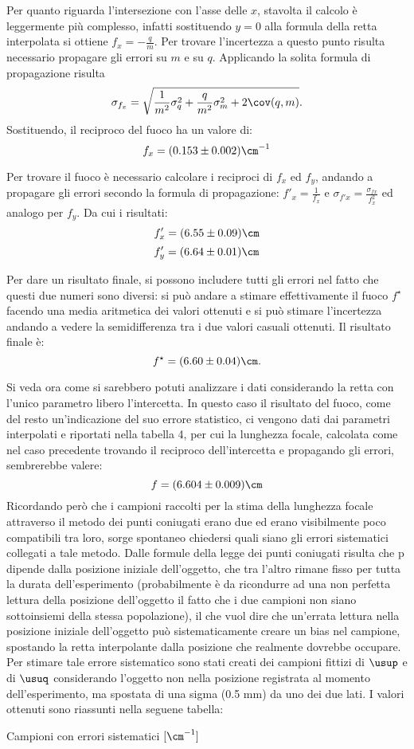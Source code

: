 Per quanto riguarda l'intersezione con l'asse delle $x$, stavolta il calcolo è leggermente più complesso, infatti sostituendo $y = 0$
 alla formula della retta interpolata si ottiene $f_x = -\frac{q}{m}$.  Per trovare l'incertezza a questo punto risulta necessario
 propagare gli errori su $m$ e su $q$. Applicando la solita formula di propagazione risulta
\[\sigma_{f_x} = \sqrt {\frac{1} {m^2} \sigma_q^2 + \frac{q}{m^2} \sigma_m^2 + 2 \cov (q,m) }.\] Sostituendo,
 il reciproco del fuoco ha un valore di:
\[f_x = (0.153 \pm 0.002) \cm^{-1}\]

Per trovare il fuoco è necessario calcolare i reciproci di $f_x$ ed $f_y$, andando a propagare gli errori secondo la formula di 
propagazione: $f'_x = \frac{1}{f_x}$ e $\sigma_{f'x} = \frac{\sigma_{fx}}{f_{x}^2}$ ed analogo per $f_y$. Da cui i risultati:
\[f'_x = (6.55 \pm 0.09) \cm \]
\[f'_y = (6.64 \pm 0.01) \cm \]

Per dare un risultato finale, si possono includere tutti gli errori nel fatto che questi due numeri sono diversi: si può andare a
 stimare effettivamente il fuoco $f^{\star}$ facendo una media aritmetica dei valori ottenuti e si può stimare l'incertezza
 andando a vedere la
 semidifferenza tra i due valori casuali ottenuti. Il risultato finale è:
\[f^{\star} = (6.60 \pm 0.04) \cm .\]

Si veda ora come si sarebbero potuti analizzare i dati considerando la retta con l'unico parametro libero l'intercetta. In questo
 caso il risultato del fuoco, come del resto un'indicazione del suo errore statistico, ci vengono dati dai parametri interpolati e
 riportati nella tabella 4, per cui la lunghezza focale, calcolata come nel caso precedente trovando il reciproco
 dell'intercetta e propagando gli errori, sembrerebbe valere:
\[f = (6.604 \pm 0.009) \cm \]
Ricordando però che i campioni raccolti per la stima della lunghezza focale attraverso il metodo dei punti coniugati erano due ed
 erano visibilmente poco compatibili tra loro, sorge spontaneo chiedersi quali siano gli errori sistematici collegati a tale metodo.
 Dalle formule della legge dei punti coniugati risulta che p dipende dalla posizione iniziale dell'oggetto, che tra
 l'altro rimane fisso per tutta la durata dell'esperimento (probabilmente è da ricondurre ad una non perfetta lettura della posizione
 dell'oggetto il fatto che i due campioni non siano sottoinsiemi della stessa popolazione), il che vuol dire che un'errata lettura
 nella posizione iniziale dell'oggetto può sistematicamente creare un bias nel campione, spostando la retta interpolante dalla
 posizione che realmente dovrebbe occupare. Per stimare tale errore sistematico sono stati creati dei campioni fittizi di $\usup$ e
 di $\usuq$ considerando l'oggetto non nella posizione registrata al momento dell'esperimento, ma spostata di una sigma (0.5 mm) da
 uno dei due lati. I valori ottenuti sono riassunti nella seguene tabella:
\begin{tabella}
	\centering
	
	\caption{Campioni con errori sistematici $[\cm^{-1}]$}
	\label{tab:02tab5}
\end{tabella}

